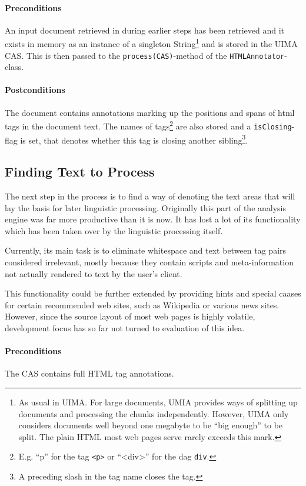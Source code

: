 \documentclass[12pt]{article}
\begin{document}
\paragraph{Preconditions} An input document retrieved in during earlier steps
has been retrieved and it exists in memory as an instance of a singleton
String\footnote{As usual in UIMA. For large documents, UMIA provides ways of
splitting up documents and processing the chunks independently. However, UIMA
only considers documents well beyond one megabyte to be ``big enough'' to be
split. The plain HTML most web pages serve rarely exceeds this mark.}   and is
stored in the UIMA CAS. This is then passed to the \verb#process(CAS)#-method of the
\verb#HTMLAnnotator#-class.
\paragraph{Postconditions} The document contains annotations marking up the
positions and spans of html tags in the document text. The names of
tags\footnote{E.g. ``p'' for the tag \texttt{<p>} or ``<div>'' for the dag
\texttt{div}.} are
also stored and a \verb#isClosing#-flag is set, that denotes whether this tag is
closing another sibling\footnote{A preceding slash in the tag name closes the tag.}.

\subsection{Finding Text to Process}

The next step in the process is to find a way of denoting the text areas that
will lay the basis for later linguistic processing. Originally this part of the
analysis engine was far more productive than it is now. It has lost a lot of its
functionality which has been taken over by the linguistic processing itself.

Currently, its main task is to eliminate whitespace and text between tag pairs
considered irrelevant, mostly because they contain scripts and meta-information
not actually rendered to text by the user's client.

This functionality could be further extended by providing hints and special
caases for certain recommended web sites, such as Wikipedia or various news
sites. However, since the source layout of most web pages is highly volatile,
development focus has so far not turned to evaluation of this idea.

\paragraph{Preconditions} The CAS contains full HTML tag annotations.
\end{document}
